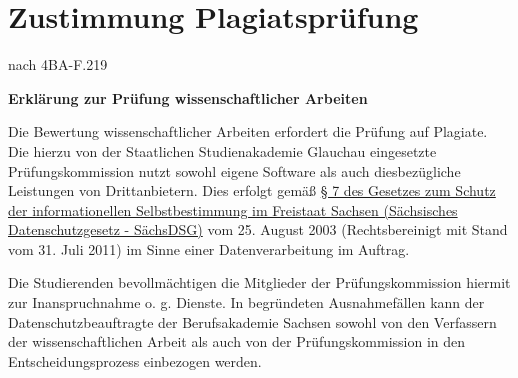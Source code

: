 \newpage
\section{Zustimmung Plagiatsprüfung}

\vspace*{2mm}

\begin{minipage}{0.5\columnwidth}

\end{minipage}
\begin{minipage}{0.45\columnwidth}
\begin{flushright}
{\small nach 4BA-F.219\\}
\end{flushright}
\end{minipage}
\vspace*{2mm}

\begin{center}\textbf{\huge{Erklärung zur Prüfung wissenschaftlicher Arbeiten}}\end{center}

\absatz
Die Bewertung wissenschaftlicher Arbeiten erfordert die Prüfung auf Plagiate. Die hierzu von der Staatlichen Studienakademie Glauchau eingesetzte Prüfungskommission nutzt sowohl eigene Software als auch diesbezügliche Leistungen von Drittanbietern. Dies erfolgt gemäß \href{https://www.revosax.sachsen.de/vorschrift/1672-Saechsisches-Datenschutzgesetz#p7}{§ 7 des Gesetzes zum Schutz der informationellen Selbstbestimmung im Freistaat Sachsen (Sächsisches Datenschutzgesetz - SächsDSG)} vom 25. August 2003 (Rechtsbereinigt mit Stand vom 31. Juli 2011) im Sinne einer Datenverarbeitung im Auftrag.

\absatz
Die Studierenden bevollmächtigen die Mitglieder der Prüfungskommission hiermit zur Inanspruchnahme o. g. Dienste. In begründeten Ausnahmefällen kann der Datenschutzbeauftragte der Berufsakademie Sachsen sowohl von den Verfassern der wissenschaftlichen Arbeit als auch von der Prüfungskommission in den Entscheidungsprozess einbezogen werden.

\absatz
\arrayrulewidth=0.5pt

